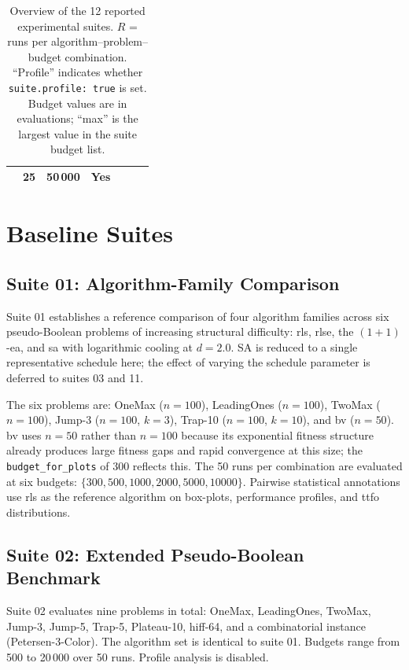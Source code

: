 \begin{table}[hp]
{\begin{tabular}{@{}cp{4cm}p{3.5cm}lrrl@{}}
      & 25 & 50\,000 & \textbf{Yes} \\
      \bottomrule
    \end{tabular}
  }
  \caption[Overview of experimental suites]{Overview of the 12
    reported experimental suites.
    $R$ = runs per algorithm--problem--budget combination.
    ``Profile'' indicates whether \texttt{suite.profile:~true} is set.
    Budget values are in evaluations; ``max'' is the largest value in the
  suite budget list.}
  \label{tab:suite-overview}
\end{table}

\section{Baseline Suites}
\subsection{Suite 01: Algorithm-Family Comparison}

Suite 01 establishes a reference comparison of four algorithm families across
six pseudo-Boolean problems of increasing structural difficulty: \acrfull{rls},
\acrshort{rlse}, the $(1+1)$-\acrshort{ea}, and \acrshort{sa} with
logarithmic cooling at $d=2.0$. SA is reduced to a single representative
schedule here; the effect of varying the schedule parameter is deferred to
suites 03 and 11.

The six problems are: OneMax ($n=100$), LeadingOnes ($n=100$), TwoMax
($n=100$), Jump-3 ($n=100$, $k=3$), Trap-10 ($n=100$, $k=10$), and \acrshort{bv}
($n=50$). \acrshort{bv} uses $n=50$ rather than $n=100$ because its exponential
fitness structure already produces large fitness gaps and rapid convergence at
this size; the \texttt{budget\_for\_plots} of 300 reflects this. The 50 runs
per combination are evaluated at six budgets: $\{300, 500, 1000, 2000, 5000,
10000\}$. Pairwise statistical annotations use \acrshort{rls} as the reference
algorithm on box-plots, performance profiles, and \acrshort{ttfo} distributions.

\subsection{Suite 02: Extended Pseudo-Boolean Benchmark}

Suite 02 evaluates nine problems in total: OneMax, LeadingOnes, TwoMax,
Jump-3, Jump-5, Trap-5, Plateau-10, \acrshort{hiff}-64, and a combinatorial
instance (Petersen-3-Color). The algorithm set is identical to suite 01.
Budgets range from 500 to 20\,000 over 50 runs. Profile analysis is disabled.

